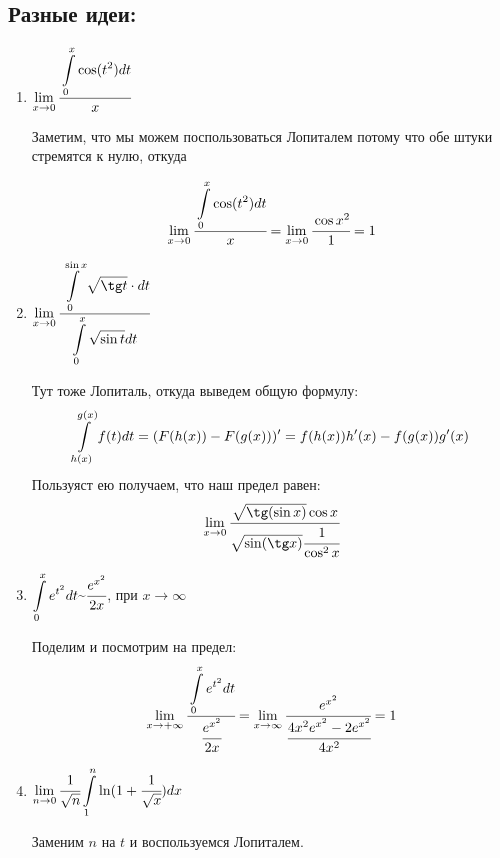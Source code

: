\subsection{Разные идеи:}

\begin{enumerate}
    \item $\lim\limits_{x\rightarrow 0 }\cfrac{\displaystyle\int\limits_{0}^{x}\cos(t^2)dt}{x}$

    Заметим, что мы можем поспользоваться Лопиталем потому что обе штуки стремятся к нулю, откуда

    $$\lim\limits_{x\rightarrow 0 }\cfrac{\displaystyle\int\limits_{0}^{x}\cos(t^2)dt}{x}= \lim\limits_{x\rightarrow 0} \cfrac{\cos x^2}{1} =1$$
    \item $\lim\limits_{x\rightarrow 0 }\cfrac{\integral{0}{\sin x}\sqrt{\tg t}\cdot dt}{\integral{0}{x} \sqrt{\sin t} dt}$

    Тут тоже Лопиталь, откуда выведем общую формулу:
    $$\displaystyle\int\limits_{h(x)}^{g(x)}f(t)dt =(F(h(x))-F(g(x)))' = f(h(x))h'(x) - f(g(x))g'(x)$$
    Пользуяст ею получаем, что наш предел равен:
    $$\lim\limits_{x\rightarrow 0 }\cfrac{\sqrt{\tg (\sin x)}\cos x}{\sqrt{\sin (\tg x)}\cfrac{1}{\cos^2x}}$$
    
    \item $\integral{0}{x}e^{t^2}dt \mytilde \cfrac{e^{x^2}}{2x}$, при $x\rightarrow \infty$

    Поделим и посмотрим на предел:
    $$\lim\limits_{x\rightarrow +\infty}\cfrac{\displaystyle\int\limits_{0}^{x}e^{t^2}dt}{\cfrac{e^{x^2}}{2x}} = \lim\limits_{x\rightarrow\infty}\cfrac{e^{x^2}}{\cfrac{4x^2 e^{x^2} - 2 e^{x^2}}{4x^2}}=1$$
    \item $\lim\limits_{n\rightarrow 0 }\cfrac{1}{\sqrt{n}}\displaystyle\int\limits_{1}^{n}\ln(1 + \cfrac{1}{\sqrt{x}})dx$
    
    Заменим $n$ на $t$ и воспользуемся Лопиталем.
\end{enumerate}